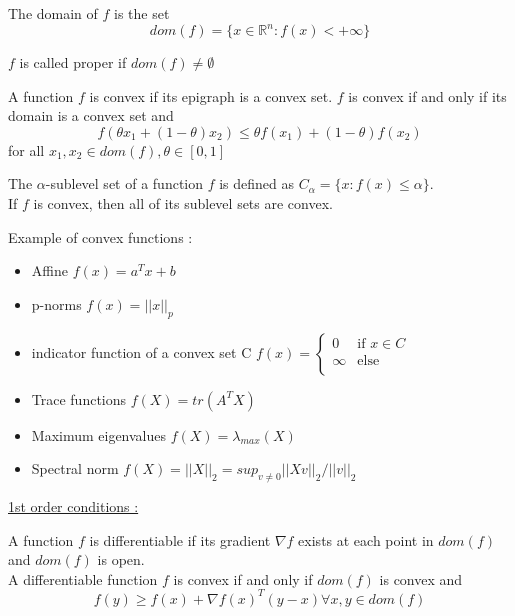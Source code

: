 \documentclass[../main.tex]{subfiles}
\begin{document}
\begin{theorem}
    The domain of $f$ is the set \begin{equation}
        dom(f) = \{x \in \mathbb{R}^n : f(x) < +\infty \}
    \end{equation}
\end{theorem}

\warning $f$ is called proper if $dom(f) \neq \emptyset$\\

\begin{theorem}
    A function $f$ is convex if its epigraph is a convex set. $f$ is convex if and only if its domain is a convex set and \begin{equation}
        f(\theta x_1 + (1-\theta) x_2) \leq \theta f(x_1) + (1-\theta) f(x_2)
    \end{equation}
    for all $x_1, x_2 \in dom(f), \theta \in [0,1]$
\end{theorem}

\begin{theorem}
    The $\alpha$-sublevel set of a function $f$ is defined as $C_\alpha = \{x : f(x) \leq \alpha \}$.\\
    If $f$ is convex, then all of its sublevel sets are convex.
\end{theorem}

Example of convex functions : \begin{itemize}
    \item Affine $f(x) = a^T x + b$
    \item p-norms $f(x) = \lvert \lvert x \rvert \rvert_p$
    \item indicator function of a convex set C $f(x) = \begin{cases}
        0 & \text{if } x\in C\\
        \infty & \text{else}\\
    \end{cases}$
    \item Trace functions $f(X) = tr(A^TX)$
    \item Maximum eigenvalues $f(X) = \lambda_{max} (X)$
    \item Spectral norm $f(X) = \lvert \lvert X \rvert \rvert_2 = sup_{v \neq 0} \lvert \lvert Xv\rvert \rvert_2 / \lvert \lvert v\rvert \rvert_2$
\end{itemize}

\quad \underline{1st order conditions :}\\
\begin{theorem}
    A function $f$ is differentiable if its gradient $\nabla f$ exists at each point in $dom(f)$ and $dom(f)$ is open.\\
    A differentiable function $f$ is convex if and only if $dom(f)$ is convex and \begin{equation}
        f(y) \geq f(x) + \nabla f(x)^T (y-x) \forall x,y\in dom(f)
    \end{equation}
\end{theorem}
\end{document}
